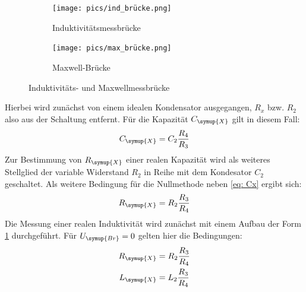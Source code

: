 \begin{figure}
\centering
\begin{subfigure}{0.49\textwidth}
\centering
  \texttt{[image: pics/ind\_brücke.png]}
\caption{Induktivitätsmessbrücke}
\label{fig: induktivität}
\end{subfigure}
\begin{subfigure}{0.49\textwidth}
  \centering
  \texttt{[image: pics/max\_brücke.png]}
  \caption{Maxwell-Brücke}
  \label{fig: maxwell}
\end{subfigure}
\caption{Induktivitäts- und Maxwellmessbrücke\cite{anleitung302}}
\label{fig: indmax}
\end{figure}

Hierbei wird zunächst von einem idealen Kondensator ausgegangen, $R_x$ bzw. $R_2$ also aus der Schaltung entfernt. Für die
Kapazität $C_{\symup{X}}$ gilt in diesem Fall:
\begin{equation}
  C_{\symup{X}} = C_2 \frac{R_4}{R_3}
  \label{eq: Cx}
\end{equation}
Zur Bestimmung von $R_{\symup{X}}$ einer realen Kapazität wird als weiteres Stellglied der variable Widerstand $R_2$ in Reihe mit dem Kondesator $C_2$
geschaltet. Als weitere Bedingung für die Nullmethode neben \eqref{eq: Cx} ergibt sich:
\begin{equation}
  R_{\symup{X}} = R_2\frac{R_3}{R_4}
  \label{eq: Rx}
\end{equation}
Die Messung einer realen Induktivität wird zunächst mit einem Aufbau der Form \ref{fig: induktivität} durchgeführt.
Für $U_{\symup{Br}} = 0$ gelten hier die Bedingungen:
\begin{align}
  \begin{aligned}
    R_{\symup{X}} &= R_2\frac{R_3}{R_4} \\
    L_{\symup{X}} &= L_2\frac{R_3}{R_4}
  \end{aligned}
  \label{eq: Lx}
\end{align}

